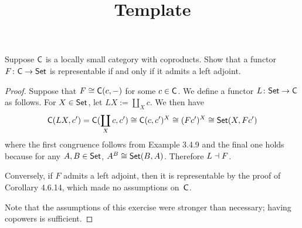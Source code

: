 \documentclass[../../solutions]{subfiles}
\title{Template}
\author{}
\begin{document}
\maketitle

%   

\begin{exercise}
  Suppose ${\mathsf{C}}$ is a locally small category with coproducts.  Show
  that a functor ${F}\colon{{\mathsf{C}}}\to{\ensuremath{\mathsf{Set}}}$ is representable if and only if
  it admits a left adjoint.
\end{exercise}

\begin{proof}
  Suppose that $F\cong {\mathsf{C}}(c,-)$ for some $c\in{\mathsf{C}}$.  We define a
  functor ${L}\colon{\ensuremath{\mathsf{Set}}}\to{{\mathsf{C}}}$ as follows.  For $X\in\mathsf{Set}$, let $LX:=
  \coprod_X c$.  We then have
  $${\mathsf{C}}(LX,c') = {\mathsf{C}}(\coprod_X c,c')
  \cong {\mathsf{C}}(c,c')^X \cong (Fc')^X \cong \mathsf{Set}(X,Fc')$$
  where the first congruence follows from Example 3.4.9 and the final
  one holds because for any $A,B\in\mathsf{Set}$, $A^B\cong\mathsf{Set}(B,A)$.
  Therefore $L\dashv F$.

  Conversely, if $F$ admits a left adjoint, then it is representable
  by the proof of Corollary 4.6.14, which made no assumptions
  on~${\mathsf{C}}$.

  Note that the assumptions of this exercise were stronger than
  necessary; having copowers is sufficient.
\end{proof}
\end{document}
